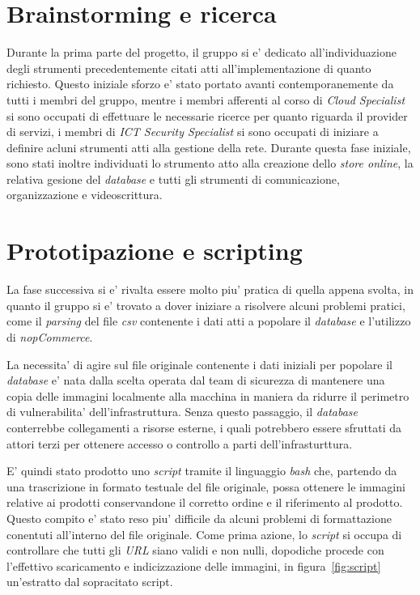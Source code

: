 \documentclass[a4paper]{report}
\begin{document}
	\section{Brainstorming e ricerca}\label{brainstorming_e_ricerca}
		Durante la prima parte del progetto, il gruppo si e' dedicato all'individuazione degli strumenti precedentemente
		citati atti all'implementazione di quanto richiesto. Questo iniziale sforzo e' stato portato avanti
		contemporanemente da tutti i membri del gruppo, mentre i membri afferenti al corso di \emph{Cloud Specialist} si
		sono occupati di effettuare le necessarie ricerce per quanto riguarda il provider di servizi, i membri di
		\emph{ICT Security Specialist} si sono occupati di iniziare a definire acluni strumenti atti alla gestione della
		rete.
		Durante questa fase iniziale, sono stati inoltre individuati lo strumento atto alla creazione dello \emph{store
		online}, la relativa gesione del \emph{database} e tutti gli strumenti di comunicazione, organizzazione e
		videoscrittura.
	\section{Prototipazione e scripting}\label{prototipazione_e_scripting}
		La fase successiva si e' rivalta essere molto piu' pratica di quella appena svolta, in quanto il gruppo si e'
		trovato a dover iniziare a risolvere alcuni problemi pratici, come il \emph{parsing} del file \emph{csv}
		contenente i dati atti a popolare il \emph{database} e l'utilizzo di \emph{nopCommerce}.

		La necessita' di agire sul file originale contenente i dati iniziali per popolare il \emph{database} e' nata
		dalla scelta operata dal team di sicurezza di mantenere una copia delle immagini localmente alla macchina in
		maniera da ridurre il perimetro di vulnerabilita' dell'infrastruttura. Senza questo passaggio, il
		\emph{database} conterrebbe collegamenti a risorse esterne, i quali potrebbero essere sfruttati da attori
		terzi per ottenere accesso o controllo a parti dell'infrasturttura.

		E' quindi stato prodotto uno \emph{script} tramite  il linguaggio \emph{bash} che, partendo da una trascrizione
		in formato testuale del file originale, possa ottenere le immagini relative ai prodotti conservandone il
		corretto ordine e il riferimento al prodotto. Questo compito e' stato reso piu' difficile da alcuni problemi di
		formattazione conentuti all'interno del file originale. Come prima azione, lo \emph{script} si occupa di
		controllare che tutti gli \emph{URL} siano validi e non nulli, dopodiche procede con l'effettivo scaricamento e
		indicizzazione delle immagini, in figura~\ref{fig:script} un'estratto dal sopracitato script.
\end{document}
